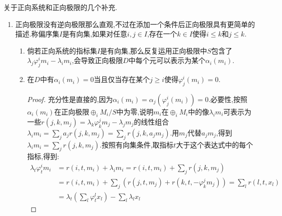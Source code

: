 关于正向系统和正向极限的几个补充.
\begin{enumerate}
	\item 正向极限没有逆向极限那么直观,不过在添加一个条件后正向极限具有更简单的描述.称偏序集$I$是有向集,如果对任意$i,j\in I$,存在一个$k\in I$使得$i\le k$和$j\le k$.
	\begin{enumerate}
		\item 倘若正向系统的指标集$I$是有向集,那么反复运用正向极限中$S$包含了$\lambda_j\varphi_j^im_i-\lambda_im_i$,会导致正向极限$D$中每个元可以表示为某个$\alpha_i(m_i)$.
		\item 在$D$中有$\alpha_i(m_i)=0$当且仅当存在某个$j\ge i$使得$\varphi_j^i(m_i)=0$.
		\begin{proof}
			
			充分性是直接的,因为$\alpha_i(m_i)=\alpha_j(\varphi_j^i(m_i))=0$.必要性,按照$\alpha_i(m_i)$在正向极限$\oplus_iM_i/S$中为零,说明$m_i$在$\oplus_iM_i$中的像$\lambda_im_i$可表示为一些$r(j,k,m_j)=\lambda_k\varphi^j_km_j-\lambda_jm_j$的线性组合$\lambda_im_i=\sum_ja_jr(j,k,m_j)=\sum_jr(j,k,a_jm_j)$.用$m_j$代替$a_jm_j$,得到$\lambda_im_i=\sum_jr(j,k,m_j)$.按照有向集条件,取指标$t$大于这个表达式中的每个指标,得到:
			\begin{align*}
		    \lambda_t\varphi^i_tm_i&=r(i,t,m_i)+\lambda_im_i=r(i,t,m_i)+\sum_jr(j,k,m_j)\\&=r(i,t,m_i)+\sum_j\left(r(j,t,m_j)+r(k,t,-\varphi_k^jm_j)\right)=\sum_lr(l,t,x_l)\\&=\lambda_t(\sum_l\varphi_t^lx_l)-\sum_l\lambda_lx_l
			\end{align*}
			

\end{proof}
\end{enumerate}
\end{enumerate}

